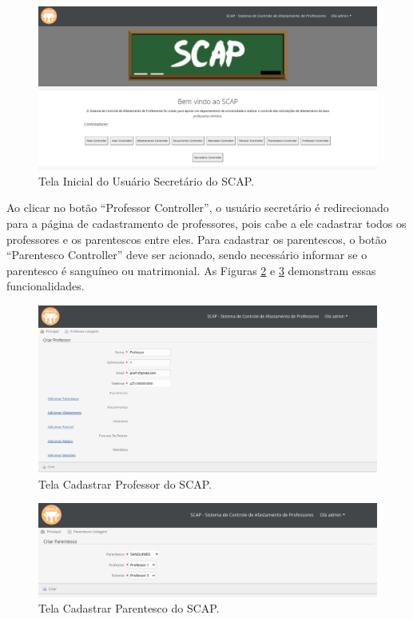 \begin{figure}[h]
	\centering
	\includegraphics[scale=0.33]{figuras/fig-projeto-usuario-secretario} 
	\caption{Tela Inicial do Usuário Secretário do SCAP.}
	\label{fig-projeto-usuario-secretario}
\end{figure}

Ao clicar no botão ``Professor Controller'', o usuário secretário é redirecionado para a página de cadastramento de professores, pois cabe a ele cadastrar todos os professores e os parentescos entre eles. Para cadastrar os parentescos, o botão ``Parentesco Controller'' deve ser acionado, sendo necessário informar se o parentesco é sanguíneo ou matrimonial. As Figuras \ref{fig-projeto-cadastrar-professor} e \ref{fig-projeto-cadastrar-parentesco} demonstram essas funcionalidades.

\begin{figure}[h]
	\centering
	\includegraphics[scale=0.33]{figuras/fig-projeto-cadastrar-professor} 
	\caption{Tela Cadastrar Professor do SCAP.}
	\label{fig-projeto-cadastrar-professor}
\end{figure}

\begin{figure}[h]
	\centering
	\includegraphics[scale=0.33]{figuras/fig-projeto-cadastrar-parentesco} 
	\caption{Tela Cadastrar Parentesco do SCAP.}
	\label{fig-projeto-cadastrar-parentesco}
\end{figure}

